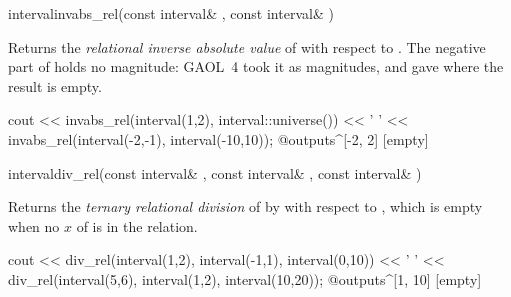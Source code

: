 \begin{deffun}{interval}{invabs\_rel}{(const interval\& , const interval\& )}
  \begin{operation}
  \end{operation}
  Returns the \emph{relational inverse absolute value} of  with
  respect to . The negative part of  holds no magnitude:
  GAOL~4 took it as magnitudes, and gave  where the result is
  empty.\newinvfive
\begin{example}
cout << invabs_rel(interval(1,2), interval::universe()) << ' '
     << invabs_rel(interval(-2,-1), interval(-10,10));
@outputs^[-2, 2] [empty]~
\end{example}
\end{deffun}

\begin{deffun}{interval}{div\_rel}{(const interval\& , const interval\& , const interval\& )}
  \begin{operation}
  \end{operation}
  Returns the \emph{ternary relational division} of  by  with
  respect to , which is empty when no $x$ of  is in the
  relation.\newinvfive
\begin{example}
cout << div_rel(interval(1,2), interval(-1,1),
                interval(0,10)) << ' '
     << div_rel(interval(5,6), interval(1,2),
                interval(10,20));
@outputs^[1, 10] [empty]~
\end{example}
\end{deffun}

